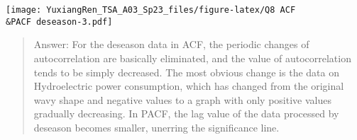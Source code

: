 \documentclass[
]{article}
\begin{document}
\texttt{[image: YuxiangRen\_TSA\_A03\_Sp23\_files/figure-latex/Q8 ACF\\\&PACF deseason-3.pdf]}

\begin{quote}
Answer: For the deseason data in ACF, the periodic changes of
autocorrelation are basically eliminated, and the value of
autocorrelation tends to be simply decreased. The most obvious change is
the data on Hydroelectric power consumption, which has changed from the
original wavy shape and negative values to a graph with only positive
values gradually decreasing. In PACF, the lag value of the data
processed by deseason becomes smaller, unerring the significance line.
\end{quote}
\end{document}

